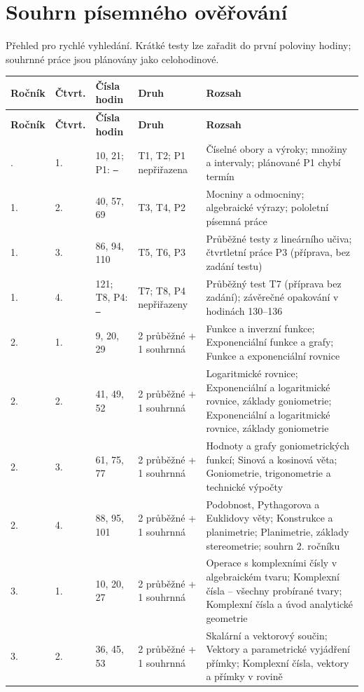 \documentclass[10pt,a4paper]{article}
\begin{document}
\section*{Souhrn písemného ověřování}
Přehled pro rychlé vyhledání. Krátké testy lze zařadit do první poloviny hodiny; souhrnné práce jsou plánovány jako celohodinové.
\footnotesize
\begin{longtable}{@{}p{17mm}p{12mm}p{27mm}p{26mm}p{72mm}@{}}
\toprule \textbf{Ročník} & \textbf{Čtvrt.} & \textbf{Čísla hodin} & \textbf{Druh} & \textbf{Rozsah}\\\midrule\endfirsthead
\toprule \textbf{Ročník} & \textbf{Čtvrt.} & \textbf{Čísla hodin} & \textbf{Druh} & \textbf{Rozsah}\\\midrule\endhead
\bottomrule\endfoot
1. & 1. & 10, 21; P1: \texttt{---} & T1, T2; P1 nepřiřazena & Číselné obory a výroky; množiny a intervaly; plánované P1 chybí termín \\
1. & 2. & 40, 57, 69 & T3, T4, P2 & Mocniny a odmocniny; algebraické výrazy; pololetní písemná práce \\
1. & 3. & 86, 94, 110 & T5, T6, P3 & Průběžné testy z lineárního učiva; čtvrtletní práce P3 (příprava, bez zadání testu) \\
1. & 4. & 121; T8, P4: \texttt{---} & T7; T8, P4 nepřiřazeny & Průběžný test T7 (příprava bez zadání); závěrečné opakování v hodinách 130--136 \\
2. & 1. & 9, 20, 29 & 2 průběžné + 1 souhrnná & Funkce a inverzní funkce; Exponenciální funkce a grafy; Funkce a exponenciální rovnice \\
2. & 2. & 41, 49, 52 & 2 průběžné + 1 souhrnná & Logaritmické rovnice; Exponenciální a logaritmické rovnice, základy goniometrie; Exponenciální a logaritmické rovnice, základy goniometrie \\
2. & 3. & 61, 75, 77 & 2 průběžné + 1 souhrnná & Hodnoty a grafy goniometrických funkcí; Sinová a kosinová věta; Goniometrie, trigonometrie a technické výpočty \\
2. & 4. & 88, 95, 101 & 2 průběžné + 1 souhrnná & Podobnost, Pythagorova a Euklidovy věty; Konstrukce a planimetrie; Planimetrie, základy stereometrie; souhrn 2. ročníku \\
3. & 1. & 10, 20, 27 & 2 průběžné + 1 souhrnná & Operace s komplexními čísly v algebraickém tvaru; Komplexní čísla – všechny probírané tvary; Komplexní čísla a úvod analytické geometrie \\
3. & 2. & 36, 45, 53 & 2 průběžné + 1 souhrnná & Skalární a vektorový součin; Vektory a parametrické vyjádření přímky; Komplexní čísla, vektory a přímky v rovině \\

\end{longtable}
\end{document}
